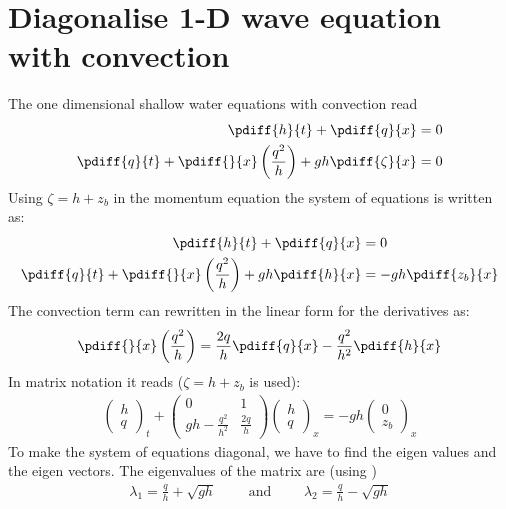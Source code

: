 \chapter{Diagonalise 1-D wave equation with convection}\label{sec:diagonalise_conservative_wave_with_convection}

The one dimensional shallow water equations  with convection
read
%
\begin{align}
    \pdiff{h}{t}  + \pdiff{q}{x} & = 0 \label{eq:continuity_for_diagonalisation}\\
    \pdiff{q}{t}  + \pdiff{}{x} \left( \frac{q^2}{h} \right) + g h \pdiff{\zeta}{x} & = 0 \label{eq:momentum_for_diagonalisation}
\end{align}
Using $\zeta = h + z_b$ in the momentum equation the system of equations is written as:
\begin{align}
    \pdiff{h}{t}  + \pdiff{q}{x} & = 0
    \\
    \pdiff{q}{t}  + \pdiff{}{x} \left( \frac{q^2}{h} \right) + g h \pdiff{h}{x} & = -gh\pdiff{z_b}{x}
\end{align}
The convection term can rewritten in the linear form for the derivatives as:
\begin{align}
    \pdiff{}{x} \left( \frac{q^2}{h} \right) = \frac{2 q}{h} \pdiff{q}{x} - \frac{q^2}{h^2}\pdiff{h}{x}
    \label{eq:convection_linear_form}
\end{align}
In matrix notation it reads ($\zeta = h +z_b$ is used):
\begin{align}
    \begin{pmatrix} h \\ q \end{pmatrix}_t +
    \begin{pmatrix} 0 & 1  \\ gh-\frac{q^2}{h^2} & \frac{2q}{h} \end{pmatrix}
    \begin{pmatrix} h \\ q \end{pmatrix}_x =
    -gh \begin{pmatrix} 0 \\ z_b \end{pmatrix}_x
\end{align}
To make the system of equations diagonal, we have to find the eigen values and the eigen vectors.
The eigenvalues of the matrix are (using \maplesoft)
\begin{align}
    \lambda_1 = \frac{q}{h} + \sqrt{gh} \qquad \mbox{ and } \qquad
    \lambda_2 = \frac{q}{h} - \sqrt{gh}
\end{align}
